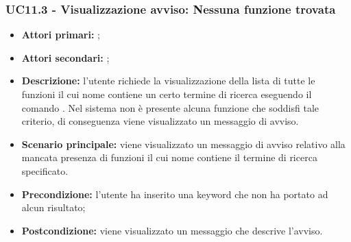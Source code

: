 \subsubsection{UC11.3 - Visualizzazione avviso: Nessuna funzione trovata}
\begin{itemize}
	\item \textbf{Attori primari:} \ua{};
	\item \textbf{Attori secondari:} \re{};
	\item \textbf{Descrizione:} l’utente richiede la visualizzazione della lista di tutte le funzioni il cui nome contiene un certo termine di ricerca eseguendo il comando \psearch{}. Nel sistema non è presente alcuna funzione che soddisfi tale criterio, di conseguenza viene visualizzato un messaggio di avviso. 
	\item \textbf{Scenario principale:} viene visualizzato un messaggio di avviso relativo alla mancata presenza di funzioni il cui nome contiene il termine di ricerca specificato.
	\item \textbf{Precondizione:} l’utente ha inserito una keyword che non ha portato ad alcun risultato;
	\item \textbf{Postcondizione:} viene visualizzato un messaggio che descrive l'avviso.
\end{itemize}